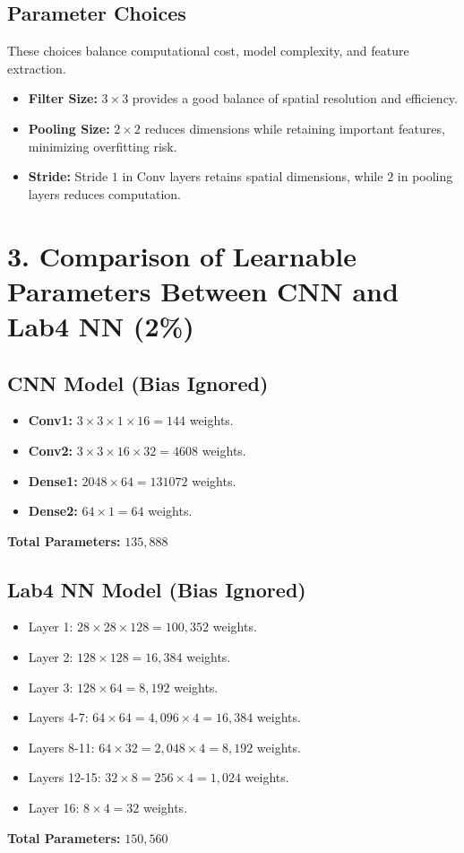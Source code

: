 \documentclass[12pt]{article}
\begin{document}
\subsection*{Parameter Choices}
These choices balance computational cost, model complexity, and feature extraction.
\begin{itemize}[topsep=0pt, itemsep=0pt]
    \item \textbf{Filter Size:} \(3 \times 3\) provides a good balance of spatial resolution and efficiency.
    \item \textbf{Pooling Size:} \(2 \times 2\) reduces dimensions while retaining important features, minimizing overfitting risk.
    \item \textbf{Stride:} Stride \(1\) in Conv layers retains spatial dimensions, while \(2\) in pooling layers reduces computation.
\end{itemize}

\section*{3. Comparison of Learnable Parameters Between CNN and Lab4 NN (2\%)}

\subsection*{CNN Model (Bias Ignored)}
\begin{itemize}[topsep=0pt, itemsep=0pt]
    \item \textbf{Conv1:} \(3 \times 3 \times 1 \times 16 = 144\) weights.
    \item \textbf{Conv2:} \(3 \times 3 \times 16 \times 32 = 4608\) weights.
    \item \textbf{Dense1:} \(2048 \times 64 = 131072\) weights.
    \item \textbf{Dense2:} \(64 \times 1 = 64\) weights.
\end{itemize}
\textbf{Total Parameters:} \(135,888\)

\subsection*{Lab4 NN Model (Bias Ignored)}
\begin{itemize}[topsep=0pt, itemsep=0pt]
    \item Layer 1: \(28 \times 28 \times 128 = 100,352\) weights.
    \item Layer 2: \(128 \times 128 = 16,384\) weights.
    \item Layer 3: \(128 \times 64 = 8,192\) weights.
    \item Layers 4-7: \(64 \times 64 = 4,096 \times 4 = 16,384\) weights.
    \item Layers 8-11: \(64 \times 32 = 2,048 \times 4 = 8,192\) weights.
    \item Layers 12-15: \(32 \times 8 = 256 \times 4 = 1,024\) weights.
    \item Layer 16: \(8 \times 4 = 32\) weights.
\end{itemize}
\textbf{Total Parameters:} \(150,560\)
\end{document}
